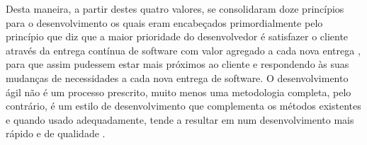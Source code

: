 Desta maneira, a partir destes quatro valores, se consolidaram doze princípios para o desenvolvimento os quais eram encabeçados primordialmente pelo princípio que diz que a maior prioridade do desenvolvedor é satisfazer o cliente através da entrega contínua de software com valor agregado a cada nova entrega \cite{Manifesto2001}, para que assim pudessem estar mais próximos ao cliente e respondendo às suas mudanças de necessidades a cada nova entrega de software. O desenvolvimento ágil não é um processo prescrito, muito menos uma metodologia completa, pelo contrário, é um estilo de desenvolvimento que complementa os métodos existentes e quando usado adequadamente, tende a resultar em num desenvolvimento mais rápido e de qualidade \cite{Ambler2002}.


